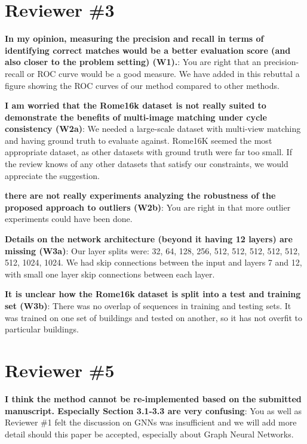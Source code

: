 \documentclass[10pt,twocolumn,letterpaper]{article}
\begin{document}


\section{Reviewer \#3}
\textbf{ In my opinion, measuring the precision and recall in terms of identifying correct matches would be a better evaluation score (and also closer to the problem setting) (W1).}:
You are right that an precision-recall or ROC curve would be a good measure. We have added in this rebuttal a figure showing the ROC curves of our method compared to other methods.

\textbf{I am worried that the Rome16k dataset is not really suited to demonstrate the benefits of multi-image matching under cycle consistency (W2a)}:
We needed a large-scale dataset with multi-view matching and having ground truth to evaluate against. Rome16K seemed the most appropriate dataset, as other datasets with ground truth were far too small. If the review knows of any other datasets that satisfy our constraints, we would appreciate the suggestion.

\textbf{there are not really experiments analyzing the robustness of the proposed approach to outliers (W2b)}:
You are right in that more outlier experiments could have been done. 

\textbf{Details on the network architecture (beyond it having 12 layers) are missing (W3a)}:
Our layer splits were: 32, 64, 128, 256, 512, 512, 512, 512, 512, 512, 1024, 1024. We had skip connections between the input and layers 7 and 12, with small one layer skip connections between each layer. 

\textbf{It is unclear how the Rome16k dataset is split into a test and training set (W3b)}:
There was no overlap of sequences in training and testing sets. It was trained on one set of buildings and tested on another, so it has not overfit to particular buildings.

\section{Reviewer \#5}

\textbf{I think the method cannot be re-implemented based on the submitted manuscript. Especially Section 3.1-3.3 are very confusing}:
You as well as Reviewer \#1 felt the discussion on GNNs was insufficient and we will add more detail should this paper be accepted, especially about Graph Neural Networks.
\end{document}
